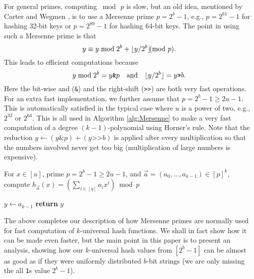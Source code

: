 \documentclass[12pt]{article}
\newcommand{\ppmod}{\rule{-1.5ex}{0ex}\pmod}
\newcommand{\floor}[1]{\lfloor {#1} \rfloor}
\begin{document}
For general primes, computing $\bmod\,p$ is slow, but an old idea,
mentioned by Carter and Wegmen \cite{carter77universal}, is to use a
Mersenne prime $p=2^b-1$, e.g., $p=2^{61}-1$ for hashing 32-bit keys or
$p=2^{89}-1$ for hashing 64-bit keys. The point in using such a Mersenne prime
is that
\begin{equation}\label{eq:Mersenne}
y\equiv y\bmod 2^{b}+\floor{y/2^b}\ppmod {p}.
\end{equation}
This leads to efficient computations because 
\[y\bmod 2^{b}=y\texttt{\&}p\quad\textnormal{and}\quad\floor{y/2^b}=y\texttt{>>}b.\]
Here the bit-wise {\sc and} (\texttt{\&}) and the right-shift (\texttt{>>}) are
both very fast operations. For
an extra fast implementation, we further assume that $p=2^b-1\geq 2u-1$.
This is automatically satisfied in the typical case where $u$ is a power
of two, e.g., $2^{32}$ or $2^{64}$. This is all used in Algorithm \ref{alg:Mersenne} to make a very fast
computation of a degree $(k-1)$-polynomial using Horner's rule. Note that
the reduction $y\gets (y\texttt\&p)+(y\texttt{>>}b)$ is applied after
every multiplication so that the numbers involved never get too big (multiplication of large numbers is expensive).
\begin{algorithm}\label{alg:Mersenne}
  \caption{For $x\in [u]$, prime $p=2^b-1\geq 2u-1$, and
    $\vec a=(a_0,\ldots,a_{k-1})\in[p]^k$, compute $h_{\vec a}(x)=\left(\sum_{i\in[q]}a_i x^i\right)\bmod p$}
$y\gets a_{k-1}$\;
{\bf return} $y$
\end{algorithm}
The above completes our description of how Mersenne primes are
normally used for fast computation of $k$-universal hash functions.
We shall in fact show how it can be made even faster, but the main
point in this paper is to present an analysis, showing how our
$k$-universal hash values from $[2^b-1]$ can be almost as good as if
they were uniformly distributed $b$-bit strings (we are only missing
the all \texttt{1}s value $2^b-1$). 
\end{document}
